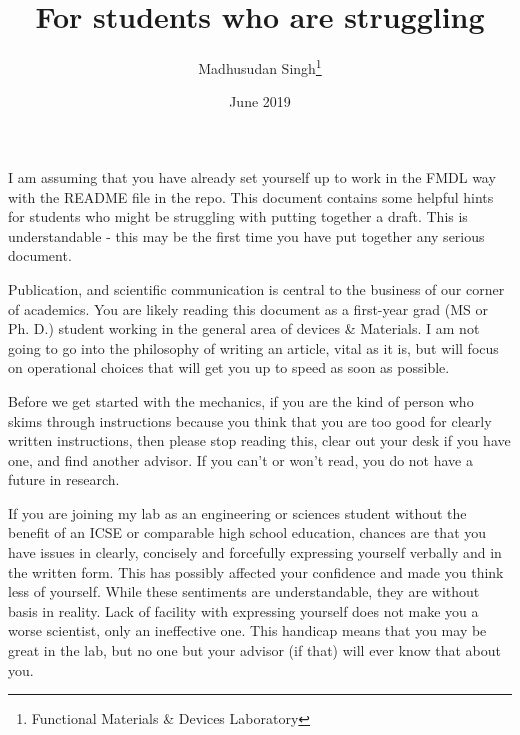\documentclass{article}
\title{For students who are struggling}
\author{Madhusudan Singh\thanks{Functional Materials \& Devices Laboratory}}
\date{June 2019}
\begin{document}
\maketitle

I am assuming that you have already set yourself up to work in the FMDL way with the README file in the repo. This document contains some helpful hints for students who might be struggling with putting together a draft. This is understandable - this may be the first time you have put together any serious document.

Publication, and scientific communication is central to the business of our corner of academics. You are likely reading this document as a first-year grad (MS or Ph. D.) student working in the general area of devices \& Materials. I am not going to go into the philosophy of writing an article, vital as it is, but will focus on operational choices that will get you up to speed as soon as possible.

Before we get started with the mechanics, if you are the kind of person who skims through instructions because you think that you are too good for clearly written instructions, then please stop reading this, clear out your desk if you have one, and find another advisor. If you can't or won't read, you do not have a future in research.


If you are joining my lab as an engineering or sciences student without the benefit of an ICSE or comparable high school education, chances are that you have issues in clearly, concisely and forcefully expressing yourself verbally and in the written form. This has possibly affected your confidence and made you think less of yourself. While these sentiments are understandable, they are without basis in reality. Lack of facility with expressing yourself does not make you a worse scientist, only an ineffective one. This handicap means that you may be great in the lab, but no one but your advisor (if that) will ever know that about you.
\end{document}
